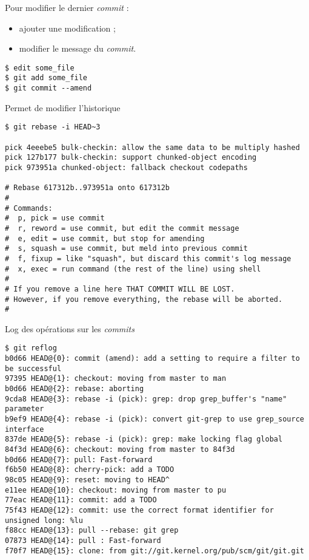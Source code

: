 \begin{frame}[fragile]{}
Pour modifier le dernier \emph{commit} :
\begin{itemize}
  \item ajouter une modification ;
  \item modifier le message du \emph{commit}.
\end{itemize}

\bigskip
\begin{verbatim}
$ edit some_file
$ git add some_file
$ git commit --amend
\end{verbatim}
\end{frame}

\begin{frame}[fragile]{}
Permet de modifier l'historique
\begin{footnotesize}
\begin{verbatim}
$ git rebase -i HEAD~3

pick 4eeebe5 bulk-checkin: allow the same data to be multiply hashed
pick 127b177 bulk-checkin: support chunked-object encoding
pick 973951a chunked-object: fallback checkout codepaths

# Rebase 617312b..973951a onto 617312b
#
# Commands:
#  p, pick = use commit
#  r, reword = use commit, but edit the commit message
#  e, edit = use commit, but stop for amending
#  s, squash = use commit, but meld into previous commit
#  f, fixup = like "squash", but discard this commit's log message
#  x, exec = run command (the rest of the line) using shell
#
# If you remove a line here THAT COMMIT WILL BE LOST.
# However, if you remove everything, the rebase will be aborted.
#
\end{verbatim}
\end{footnotesize}
\end{frame}

\begin{frame}[fragile]{}
Log des opérations sur les \emph{commits}
\begin{footnotesize}
\begin{verbatim}
$ git reflog
b0d66 HEAD@{0}: commit (amend): add a setting to require a filter to be successful
97395 HEAD@{1}: checkout: moving from master to man
b0d66 HEAD@{2}: rebase: aborting
9cda8 HEAD@{3}: rebase -i (pick): grep: drop grep_buffer's "name" parameter
b9ef9 HEAD@{4}: rebase -i (pick): convert git-grep to use grep_source interface
837de HEAD@{5}: rebase -i (pick): grep: make locking flag global
84f3d HEAD@{6}: checkout: moving from master to 84f3d
b0d66 HEAD@{7}: pull: Fast-forward
f6b50 HEAD@{8}: cherry-pick: add a TODO
98c05 HEAD@{9}: reset: moving to HEAD^
e11ee HEAD@{10}: checkout: moving from master to pu
77eac HEAD@{11}: commit: add a TODO
75f43 HEAD@{12}: commit: use the correct format identifier for unsigned long: %lu
f88cc HEAD@{13}: pull --rebase: git grep
07873 HEAD@{14}: pull : Fast-forward
f70f7 HEAD@{15}: clone: from git://git.kernel.org/pub/scm/git/git.git
\end{verbatim}
\end{footnotesize}
\end{frame}

